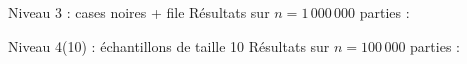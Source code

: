 \begin{frame}{Niveau 3 : cases noires + file}
Résultats sur $n=1\,000\,000$ parties :
\begin{center}
\end{center}
\end{frame}


\begin{frame}{Niveau 4(10) : échantillons de taille 10}
Résultats sur $n=100\,000$ parties :
\begin{center}
\end{center}
\end{frame}

